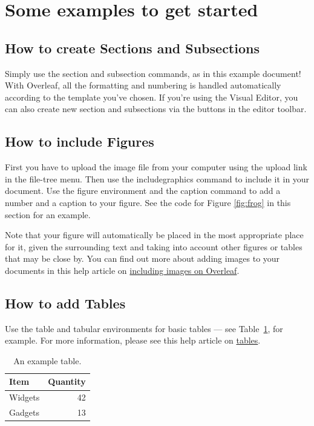 \documentclass{article}
\begin{document}
\section{Some examples to get started}

\subsection{How to create Sections and Subsections}

Simply use the section and subsection commands, as in this example document! With Overleaf, all the formatting and numbering is handled automatically according to the template you've chosen. If you're using the Visual Editor, you can also create new section and subsections via the buttons in the editor toolbar.

\subsection{How to include Figures}

First you have to upload the image file from your computer using the upload link in the file-tree menu. Then use the includegraphics command to include it in your document. Use the figure environment and the caption command to add a number and a caption to your figure. See the code for Figure \ref{fig:frog} in this section for an example.

Note that your figure will automatically be placed in the most appropriate place for it, given the surrounding text and taking into account other figures or tables that may be close by. You can find out more about adding images to your documents in this help article on \href{https://www.overleaf.com/learn/how-to/Including_images_on_Overleaf}{including images on Overleaf}.

\subsection{How to add Tables}

Use the table and tabular environments for basic tables --- see Table~\ref{tab:widgets}, for example. For more information, please see this help article on \href{https://www.overleaf.com/learn/latex/tables}{tables}. 

\begin{table}[H]
\centering
\begin{tabular}{l|r}
Item & Quantity \\\hline
Widgets & 42 \\
Gadgets & 13
\end{tabular}
\caption{\label{tab:widgets}An example table.}
\end{table}
\end{document}
